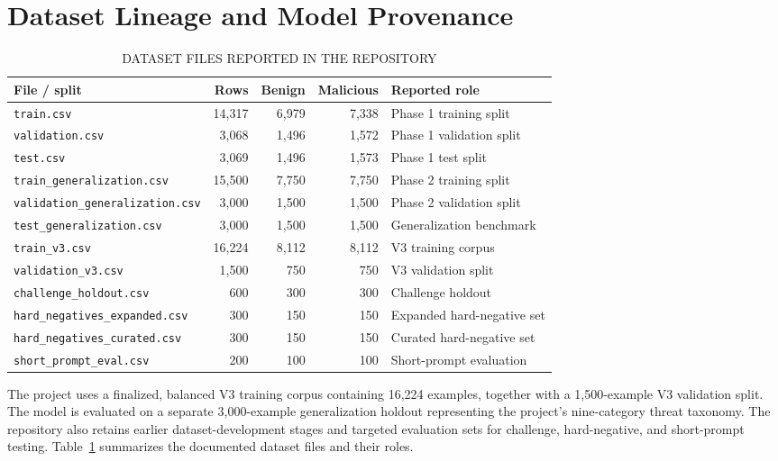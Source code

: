 \documentclass[conference]{IEEEtran}
\begin{document}
\section{Dataset Lineage and Model Provenance}

\begin{table}[t]
\caption{DATASET FILES REPORTED IN THE REPOSITORY}
\label{tab:datasets}
\centering
\begin{tabular}{lrrrl}
\toprule
\textbf{File / split} & \textbf{Rows} & \textbf{Benign} & \textbf{Malicious} & \textbf{Reported role} \\
\midrule
\texttt{train.csv} & 14,317 & 6,979 & 7,338 & Phase 1 training split \\
\texttt{validation.csv} & 3,068 & 1,496 & 1,572 & Phase 1 validation split \\
\texttt{test.csv} & 3,069 & 1,496 & 1,573 & Phase 1 test split \\
\texttt{train\_generalization.csv} & 15,500 & 7,750 & 7,750 & Phase 2 training split \\
\texttt{validation\_generalization.csv} & 3,000 & 1,500 & 1,500 & Phase 2 validation split \\
\texttt{test\_generalization.csv} & 3,000 & 1,500 & 1,500 & Generalization benchmark \\
\texttt{train\_v3.csv} & 16,224 & 8,112 & 8,112 & V3 training corpus \\
\texttt{validation\_v3.csv} & 1,500 & 750 & 750 & V3 validation split \\
\texttt{challenge\_holdout.csv} & 600 & 300 & 300 & Challenge holdout \\
\texttt{hard\_negatives\_expanded.csv} & 300 & 150 & 150 & Expanded hard-negative set \\
\texttt{hard\_negatives\_curated.csv} & 300 & 150 & 150 & Curated hard-negative set \\
\texttt{short\_prompt\_eval.csv} & 200 & 100 & 100 & Short-prompt evaluation \\
\bottomrule
\end{tabular}
\end{table}
The project uses a finalized, balanced V3 training corpus containing 16,224 examples, together with a 1,500-example V3 validation split. The model is evaluated on a separate 3,000-example generalization holdout representing the project's nine-category threat taxonomy. The repository also retains earlier dataset-development stages and targeted evaluation sets for challenge, hard-negative, and short-prompt testing. Table~\ref{tab:datasets} summarizes the documented dataset files and their roles.
\end{document}

